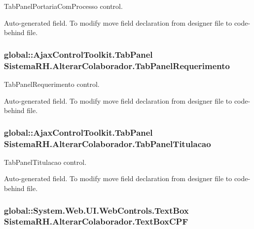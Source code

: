 TabPanelPortariaComProcesso control. 

Auto-\/generated field. To modify move field declaration from designer file to code-\/behind file. \hypertarget{class_sistema_r_h_1_1_alterar_colaborador_a0ca2c8e74bd9b6f067256d1bb5a97b7b}{
\subsubsection[{TabPanelRequerimento}]{\setlength{\rightskip}{0pt plus 5cm}global::AjaxControlToolkit.TabPanel {\bf SistemaRH.AlterarColaborador.TabPanelRequerimento}}}
\label{class_sistema_r_h_1_1_alterar_colaborador_a0ca2c8e74bd9b6f067256d1bb5a97b7b}


TabPanelRequerimento control. 

Auto-\/generated field. To modify move field declaration from designer file to code-\/behind file. \hypertarget{class_sistema_r_h_1_1_alterar_colaborador_aa85d98802a94ab43dc4c333e45841e33}{
\subsubsection[{TabPanelTitulacao}]{\setlength{\rightskip}{0pt plus 5cm}global::AjaxControlToolkit.TabPanel {\bf SistemaRH.AlterarColaborador.TabPanelTitulacao}}}
\label{class_sistema_r_h_1_1_alterar_colaborador_aa85d98802a94ab43dc4c333e45841e33}


TabPanelTitulacao control. 

Auto-\/generated field. To modify move field declaration from designer file to code-\/behind file. \hypertarget{class_sistema_r_h_1_1_alterar_colaborador_a2f6706d665a7891801462c566c15b202}{
\subsubsection[{TextBoxCPF}]{\setlength{\rightskip}{0pt plus 5cm}global::System.Web.UI.WebControls.TextBox {\bf SistemaRH.AlterarColaborador.TextBoxCPF}}}
\label{class_sistema_r_h_1_1_alterar_colaborador_a2f6706d665a7891801462c566c15b202}


